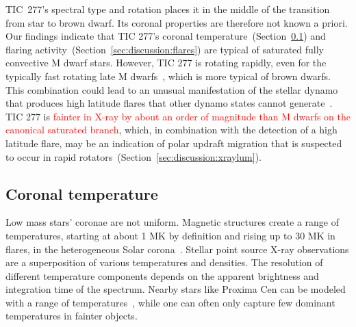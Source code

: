 \documentclass[twocolumn]{aastex631}
\begin{document}
TIC~277's spectral type and rotation places it in the middle of the transition from star to brown dwarf. Its coronal properties are therefore not known a priori. Our findings indicate that TIC 277's coronal temperature~(Section~\ref{sec:discussion:xraytemp}) and flaring activity~(Section~\ref{sec:discussion:flares}) are typical of saturated fully convective M dwarf stars. However, TIC 277 is rotating rapidly, even for the typically fast rotating late M dwarfs~\citep{medina2022galactic}, which is more typical of brown dwarfs. This combination could lead to an unusual manifestation of the stellar dynamo that produces high latitude flares that other dynamo states cannot generate~\citep{weber2016modeling, weber2023understanding}. TIC 277 is \textcolor{red}{fainter in X-ray by about an order of magnitude than M dwarfs on the canonical saturated branch}, which, in combination with the detection of a high latitude flare, may be an indication of polar updraft migration that is suspected to occur in rapid rotators~(Section~\ref{sec:discussion:xraylum}).


\subsection{Coronal temperature}
\label{sec:discussion:xraytemp}
Low mass stars' coronae are not uniform. Magnetic structures create a range of temperatures, starting at about 1 MK by definition and rising up to 30 MK in flares, in the heterogeneous Solar corona~\citep{vaiana1978recent}. Stellar point source X-ray observations are a superposition of various temperatures and densities. The resolution of different temperature components depends on the apparent brightness and integration time of the spectrum. Nearby stars like Proxima Cen can be modeled with a range of temperatures~\citep[e.g.,][]{gudel2004flares, drake2020pointing}, while one can often only capture few dominant temperatures in fainter objects.  
\end{document}
